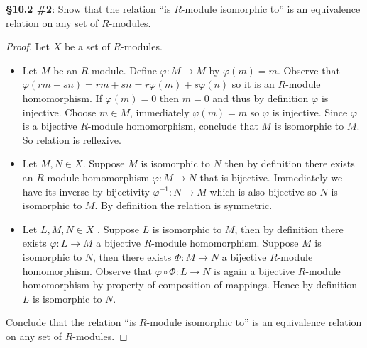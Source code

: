 \documentclass[8pt]{amsart}
\theoremstyle{plain}%
\theoremstyle{definition}
\theoremstyle{remark}
\numberwithin{equation}{section}
\begin{document}
\textbf{\S 10.2 \#2}: Show that the relation ``is $R$-module isomorphic to'' is an equivalence relation on any set of $R$-modules.
	\begin{proof}
		Let $X$ be a set of $R$-modules.
		\begin{itemize}
			\item {\color{red} Let $M$ be an $R$-module. Define $\varphi : M \to M$ by $\varphi(m) = m$. Observe that $\varphi(rm  + sn) = rm + sn = r\varphi(m) + s\varphi(n)$ so it is an $R$-module homomorphism. If $\varphi(m) = 0$ then $m = 0$ and thus by definition $\varphi$ is injective. Choose $m \in M$, immediately $\varphi(m) = m$ so $\varphi$ is injective. Since $\varphi$ is a bijective $R$-module homomorphism, conclude  that $M$ is isomorphic to $M$. So relation is reflexive.}
			\item Let $M, N \in X$. Suppose $M$ is isomorphic to $N$ then by definition there exists {\color{red} an $R$-module homomorphism} $\varphi : M \to N$ that is bijective. Immediately we have {\color{red} its inverse by bijectivity} $\varphi^{-1} : N \to M$ which is also bijective so $N$ is isomorphic to $M$. By definition the relation is symmetric.
			\item Let $L, M, N \in X$ . Suppose $L$ is isomorphic to $M$, then by definition there exists $\varphi : L \to M$ a bijective $R$-module homomorphism. Suppose $M$ is isomorphic to $N$, then there exists $\Phi : M \to N$ a bijective $R$-module homomorphism. Observe that $\varphi \circ \Phi : L \to N$ is again a bijective $R$-module homomorphism by property of composition of mappings. Hence by definition $L$ is isomorphic to $N$.
		\end{itemize}
		Conclude that the relation ``is $R$-module isomorphic to'' is an equivalence relation on any set of $R$-modules.
	\end{proof}
\end{document}
